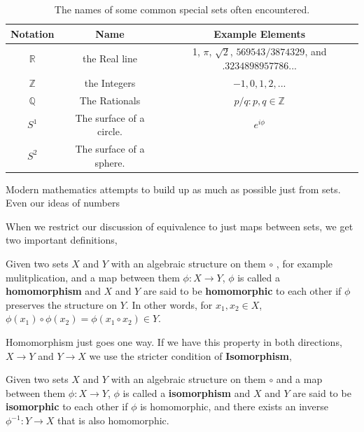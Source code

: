 \begin{table}
\begin{tabular}{| c | c | c |}
  \hline
  Notation & Name & Example Elements \\
  \hline
  $\mathbb{R}$ & the Real line & 1, $\pi$, $\sqrt{2}$, $569543/3874329$, and $.3234898957786...$ \\
   $\mathbb{Z}$ & the Integers &  $-1, 0, 1, 2,...$ \\
  $\mathbb{Q}$ & The Rationals & $p/q : p,q \in \mathbb{Z}$ \\
  $S^1$ &  The surface of a circle. & $e^{i \phi} $ \\
  $S^2$ & The surface of a sphere. & \\
  \hline
\end{tabular}
  \caption{The names of some common special sets often encountered.}
  \label{tab:sets}
\end{table}



  Modern mathematics attempts to build up as much as possible just from sets.  Even our ideas of numbers

When we restrict our discussion of equivalence to just maps between sets, we get two important definitions,

\begin{definition}[Homomorphism]
  Given two sets $X$ and $Y$ with an algebraic structure on them $\circ$ , for example mulitplication, and a map between them $\phi:X\rightarrow Y$, $\phi$ is called a \textbf{homomorphism} and $X$ and $Y$ are said to be \textbf{homomorphic} to each other if $\phi$ preserves the structure on $Y$.  In other words, for $x_1,x_2 \in X$, $\phi(x_1)\circ \phi(x_2) = \phi(x_1 \circ x_2) \in Y$.
\end{definition}

Homomorphism just goes one way.  If we have this property in both directions, $X\rightarrow Y$ and $Y\rightarrow X$ we use the stricter condition of \textbf{Isomorphism},

\begin{definition}[Isomorphism]
  Given two sets $X$ and $Y$ with an algebraic structure on them $\circ$ and a map between them $\phi:X\rightarrow Y$, $\phi$ is called a \textbf{isomorphism} and $X$ and $Y$ are said to be \textbf{isomorphic} to each other if $\phi$ is homomorphic, and there exists an inverse $\phi^{-1}: Y \rightarrow X$ that is also homomorphic.
\end{definition}

